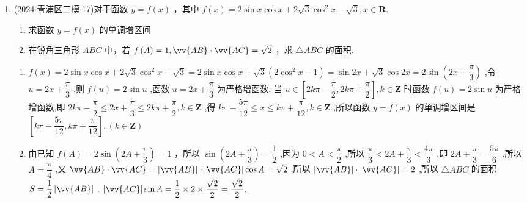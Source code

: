 \begin{enumerate}
    \item (2024$\cdot$青浦区二模$\cdot$17)对于函数 $y = f\left( x\right)$ ，其中 $f\left( x\right)  = 2\sin x\cos x + 2\sqrt{3}{\cos }^{2}x - \sqrt{3},x \in  \mathbf{R}$.
    \begin{enumerate}
        \item 求函数 $y = f\left( x\right)$ 的单调增区间
        \item 在锐角三角形 ${ABC}$ 中，若 $f\left( A\right)  = 1,\vv{AB} \cdot  \vv{AC} = \sqrt{2}$ ，求 $\bigtriangleup  {ABC}$ 的面积.
    \end{enumerate}
    \begin{jieda}
        \begin{enumerate}
            \item $f\left( x\right)  = 2\sin x\cos x + 2\sqrt{3}{\cos }^{2}x - \sqrt{3} = 2\sin x\cos x +  \sqrt{3}\left( {2{\cos }^{2}x - 1}\right)  = \sin {2x} + \sqrt{3}\cos {2x} = 2\sin \left( {{2x} + \dfrac{\pi }{3}}\right)$ ,令 $u =  {2x} + \dfrac{\pi }{3}$ ,则 $f\left( u\right)  = 2\sin u$ ,函数 $u = {2x} + \dfrac{\pi }{3}$ 为严格增函数, 当 $u \in  \left\lbrack  {{2k\pi } - \dfrac{\pi }{2},{2k\pi } + \dfrac{\pi }{2}}\right\rbrack  ,k \in  \mathbf{Z}$ 时函数 $f\left( u\right)  = 2\sin u$ 为严格增函数,即 ${2k\pi } - \dfrac{\pi }{2} \leq  {2x} + \dfrac{\pi }{3} \leq  {2k\pi } + \dfrac{\pi }{2},k \in  \mathbf{Z}$ ,得 ${k\pi } - \dfrac{5\pi }{12} \leq  x \leq  {k\pi } + \dfrac{\pi }{12},k \in  \mathbf{Z}$ ,所以函数 $y = f\left( x\right)$ 的单调增区间是 $\left\lbrack  {{k\pi } - \dfrac{5\pi }{12},{k\pi } + \dfrac{\pi }{12}}\right\rbrack  ,\left( {k \in  \mathbf{Z}}\right)$
            
            \item 由已知 $f\left( A\right)  = 2\sin \left( {{2A} + \dfrac{\pi }{3}}\right)  = 1$ ，所以 $\sin \left( {{2A} + \dfrac{\pi }{3}}\right)  =  \dfrac{1}{2}$ ,因为 $0 < A < \dfrac{\pi }{2}$ ,所以 $\dfrac{\pi }{3} < {2A} + \dfrac{\pi }{3} < \dfrac{4\pi }{3}$ ,即 ${2A} + \dfrac{\pi }{3} =  \dfrac{5\pi }{6}$ ,所以 $A = \dfrac{\pi }{4}$ ,又 $\vv{AB} \cdot  \vv{AC} = \left| \vv{AB}\right|  \cdot  \left| \vv{AC}\right| \cos A = \sqrt{2}$ ,所以 $\left| \vv{AB}\right|  \cdot  \left| \vv{AC}\right|  = 2$ ,所以 $\bigtriangleup {ABC}$ 的面积 $S = \dfrac{1}{2}\left| \vv{AB}\right|$ . $\left| \vv{AC}\right| \sin A = \dfrac{1}{2} \times  2 \times  \dfrac{\sqrt{2}}{2} = \dfrac{\sqrt{2}}{2}$.
        \end{enumerate}
    \end{jieda}


\end{enumerate}
